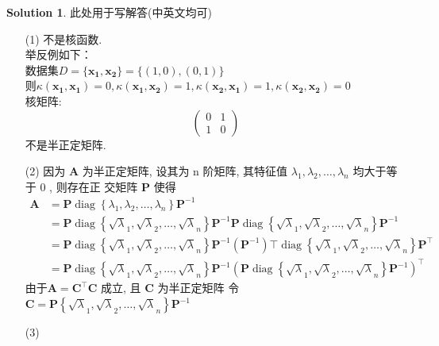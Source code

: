 \documentclass[a4paper,UTF8]{article}
\numberwithin{equation}{section}
\theoremstyle{definition}
\newtheorem*{solution}{Solution}
\newcommand{\bds}{\boldsymbol}
\begin{document}
\begin{solution}
	此处用于写解答(中英文均可)
	\begin{enumerate}
		\item[(1)]
		不是核函数. \\
		举反例如下：\\数据集$D=\{\bds{x_1},\bds{x_2}\}=\{(1,0), (0,1)\}$ \\
		则$\kappa(\bds{x_1}, \bds{x_1}) = 0, \kappa(\bds{x_1},\bds{x_2}) = 1, \kappa(\bds{x_2}, \bds{x_1}) = 1, \kappa(\bds{x_2}, \bds{x_2})=0$ \\
		核矩阵:\\
		\begin{equation}
			\left(
			\begin{array}{cc}
				0 & 1 \\
				1 & 0
			\end{array}
			\right)
		\end{equation}
		不是半正定矩阵.
		\item[(2)]
		因为 $\mathbf{A}$ 为半正定矩阵, 设其为 $\mathrm{n}$ 阶矩阵, 其特征值 $\lambda_1, \lambda_2, \ldots, \lambda_n$ 均大于等于 0 , 则存在正 交矩阵 $\mathbf{P}$ 使得
		$$
		\begin{aligned}
		\mathbf{A} & =\mathbf{P} \operatorname{diag}\left\{\lambda_1, \lambda_2, \ldots, \lambda_n\right\} \mathbf{P}^{-1} \\
		& =\mathbf{P} \operatorname{diag}\left\{\sqrt{\lambda}_1, \sqrt{\lambda}_2, \ldots, \sqrt{\lambda}_n\right\} \mathbf{P}^{-1} \mathbf{P} \operatorname{diag}\left\{\sqrt{\lambda}_1, \sqrt{\lambda}_2, \ldots, \sqrt{\lambda}_n\right\} \mathbf{P}^{-1} \\
		& =\mathbf{P} \operatorname{diag}\left\{\sqrt{\lambda}_1, \sqrt{\lambda}_2, \ldots, \sqrt{\lambda}_n\right\} \mathbf{P}^{-1}\left(\mathbf{P}^{-1}\right) \top \operatorname{diag}\left\{\sqrt{\lambda}_1, \sqrt{\lambda}_2, \ldots, \sqrt{\lambda}_n\right\} \mathbf{P}^ \top \\
		& =\mathbf{P} \operatorname{diag}\left\{\sqrt{\lambda}_1, \sqrt{\lambda}_2, \ldots, \sqrt{\lambda}_n\right\} \mathbf{P}^{-1}\left(\mathbf{P} \operatorname{diag}\left\{\sqrt{\lambda}_1, \sqrt{\lambda}_2, \ldots, \sqrt{\lambda}_n\right\} \mathbf{P}^{-1}\right)^ \top
		\end{aligned}
		$$
		由于$\mathbf{A}=\mathbf{C}^{\top} \mathbf{C}$ 成立, 且 $\mathbf{C}$ 为半正定矩阵
		令 $\mathbf{C}=\mathbf{P}\left\{\sqrt{\lambda}_1, \sqrt{\lambda}_2, \ldots, \sqrt{\lambda}_n\right\} \mathbf{P}^{-1}$
		\item[(3)]

\end{enumerate}
\end{solution}
\end{document}
